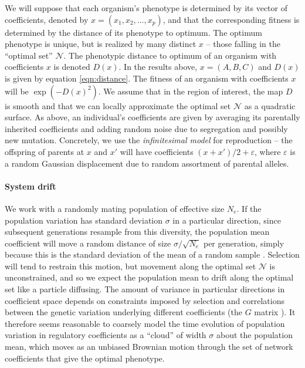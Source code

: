 \documentclass{article}
\newcommand{\1}{\mathbbm{1}}
\newcommand{\allS}{\mathcal{N}}
\begin{document}
We will suppose that each organism's phenotype is determined by its vector of coefficients, denoted by $x=(x_1, x_2, \ldots, x_p)$,
and that the corresponding fitness is determined by the distance of its phenotype to optimum.
The optimum phenotype is unique, but is realized by many distinct $x$ -- those falling in the ``optimal set'' $\allS$.
The phenotypic distance to optimum of an organism with coefficients $x$ is denoted $D(x)$.
In the results above, $x = (A,B,C)$ and $D(x)$ is given by equation \eqref{eqn:distance}.
The fitness of an organism with coefficients $x$ will be $\exp(-D(x)^2)$.
We assume that in the region of interest, the map $D$ is smooth
and that we can locally approximate the optimal set $\allS$ as a quadratic surface.
As above, an individual's coefficients are given by averaging its parentally inherited coefficients and adding random noise due to segregation and possibly new mutation.
Concretely, we use the \emph{infinitesimal model} for reproduction \citep{barton2016infinitesimal} --
the offspring of parents at $x$ and $x'$ will have coefficients $(x+x')/2 + \varepsilon$,
where $\varepsilon$ is a random Gaussian displacement due to random assortment of parental alleles.


\paragraph{System drift}
We work with a randomly mating population of effective size $N_e$. 
If the population variation has standard deviation $\sigma$ in a particular direction,
since subsequent generations resample from this diversity,
the population mean coefficient will move a random distance of size $\sigma/\sqrt{N_e}$ per generation,
simply because this is the standard deviation of the mean of a random sample \citep{lande1981models}.
Selection will tend to restrain this motion,
but movement along the optimal set $\allS$ is unconstrained,
and so we expect the population mean to drift along the optimal set like a particle diffusing.
The amount of variance in particular directions in coefficient space 
depends on constraints imposed by selection and 
correlations between the genetic variation underlying different coefficients 
(the $G$ matrix \citep{arnold2008understanding}).
It therefore seems reasonable to coarsely model the time evolution of population variation in regulatory coefficients as 
a ``cloud'' of width $\sigma$ about the population mean, 
which moves as an unbiased Brownian motion through the set of network coefficients that give the optimal phenotype.
\end{document}
